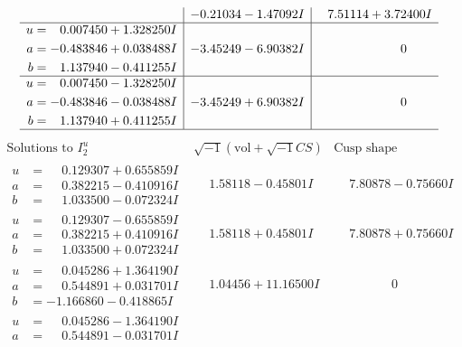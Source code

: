 \documentclass[1p]{elsarticle_modified}
\theoremstyle{definition}
\newcommand{\I}{\sqrt{-1}}
\begin{document}
$$\begin{array}{c|c|c}
 & -0.21034 - 1.47092 I & \phantom{-}7.51114 + 3.72400 I \\ \hline\begin{aligned}
u &= \phantom{-}0.007450 + 1.328250 I \\
a &= -0.483846 + 0.038488 I \\
b &= \phantom{-}1.137940 - 0.411255 I\end{aligned}
 & -3.45249 - 6.90382 I & \phantom{-0.000000 } 0 \\ \hline\begin{aligned}
u &= \phantom{-}0.007450 - 1.328250 I \\
a &= -0.483846 - 0.038488 I \\
b &= \phantom{-}1.137940 + 0.411255 I\end{aligned}
 & -3.45249 + 6.90382 I & \phantom{-0.000000 } 0\\
 \hline 
 \end{array}$$\newpage$$\begin{array}{c|c|c}  
\text{Solutions to }I^u_{2}& \I (\text{vol} + \sqrt{-1}CS) & \text{Cusp shape}\\
 \hline 
\begin{aligned}
u &= \phantom{-}0.129307 + 0.655859 I \\
a &= \phantom{-}0.382215 - 0.410916 I \\
b &= \phantom{-}1.033500 - 0.072324 I\end{aligned}
 & \phantom{-}1.58118 - 0.45801 I & \phantom{-}7.80878 - 0.75660 I \\ \hline\begin{aligned}
u &= \phantom{-}0.129307 - 0.655859 I \\
a &= \phantom{-}0.382215 + 0.410916 I \\
b &= \phantom{-}1.033500 + 0.072324 I\end{aligned}
 & \phantom{-}1.58118 + 0.45801 I & \phantom{-}7.80878 + 0.75660 I \\ \hline\begin{aligned}
u &= \phantom{-}0.045286 + 1.364190 I \\
a &= \phantom{-}0.544891 + 0.031701 I \\
b &= -1.166860 - 0.418865 I\end{aligned}
 & \phantom{-}1.04456 + 11.16500 I & \phantom{-0.000000 } 0 \\ \hline\begin{aligned}
u &= \phantom{-}0.045286 - 1.364190 I \\
a &= \phantom{-}0.544891 - 0.031701 I \\

\end{aligned}
\end{array}$$
\end{document}
